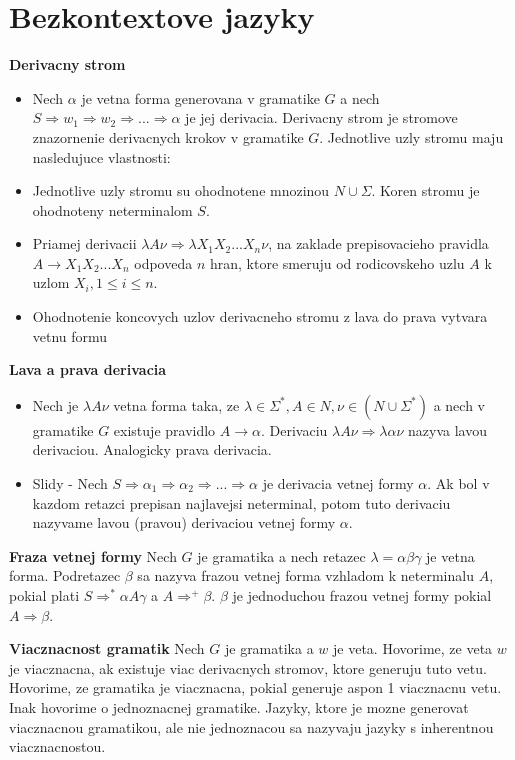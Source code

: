 \documentclass[12pt]{article}
\begin{document}
\section{Bezkontextove jazyky}
\textbf{Derivacny strom}
\begin{itemize}
	\item Nech $\alpha$ je vetna forma generovana v gramatike $G$ a nech $S \Rightarrow w_{1} \Rightarrow w_{2} \Rightarrow ... \Rightarrow \alpha$
		je jej derivacia. Derivacny strom je stromove znazornenie derivacnych krokov v gramatike $G$. Jednotlive uzly stromu maju nasledujuce vlastnosti:
	\item Jednotlive uzly stromu su ohodnotene mnozinou $N \cup \Sigma$. Koren stromu je ohodnoteny neterminalom $S$.
	\item Priamej derivacii $\lambda A\nu \Rightarrow \lambda X_{1}X_{2}...X_{n}\nu$, na zaklade prepisovacieho pravidla $A \to X_{1}X_{2}...X_{n}$
		odpoveda $n$ hran, ktore smeruju od rodicovskeho uzlu $A$ k uzlom $X_{i}, 1 \le i \le n$.
	\item Ohodnotenie koncovych uzlov derivacneho stromu z lava do prava vytvara vetnu formu
\end{itemize}

\textbf{Lava a prava derivacia}
\begin{itemize}
	\item Nech je $\lambda A\nu$ vetna forma taka, ze $\lambda \in \Sigma^{*}, A \in N, \nu \in (N \cup \Sigma^{*})$ a nech v gramatike $G$ existuje
		pravidlo $A \to \alpha$. Derivaciu $\lambda A\nu \Rightarrow \lambda\alpha\nu$ nazyva lavou derivaciou. Analogicky prava derivacia.
	\item Slidy - Nech $S \Rightarrow \alpha_{1} \Rightarrow \alpha_{2} \Rightarrow ... \Rightarrow \alpha$ je derivacia vetnej formy $\alpha$.
		Ak bol v kazdom retazci prepisan najlavejsi neterminal, potom tuto derivaciu nazyvame lavou (pravou) derivaciou vetnej formy $\alpha$.
\end{itemize}

\textbf{Fraza vetnej formy}
Nech $G$ je gramatika a nech retazec $\lambda = \alpha\beta\gamma$ je vetna forma. Podretazec $\beta$ sa nazyva frazou vetnej forma vzhladom k neterminalu $A$, pokial plati
$S \Rightarrow^{*} \alpha A\gamma$ a $A \Rightarrow^{+} \beta$. $\beta$ je jednoduchou frazou vetnej formy pokial $A \Rightarrow \beta$.

\textbf{Viacznacnost gramatik}
Nech $G$ je gramatika a $w$ je veta. Hovorime, ze veta $w$ je viacznacna, ak existuje viac derivacnych stromov, ktore generuju tuto vetu.
Hovorime, ze gramatika je viacznacna, pokial generuje aspon 1 viacznacnu vetu. Inak hovorime o jednoznacnej gramatike. Jazyky, ktore je mozne
generovat viacznacnou gramatikou, ale nie jednoznacou sa nazyvaju jazyky s inherentnou viacznacnostou.
\end{document}
